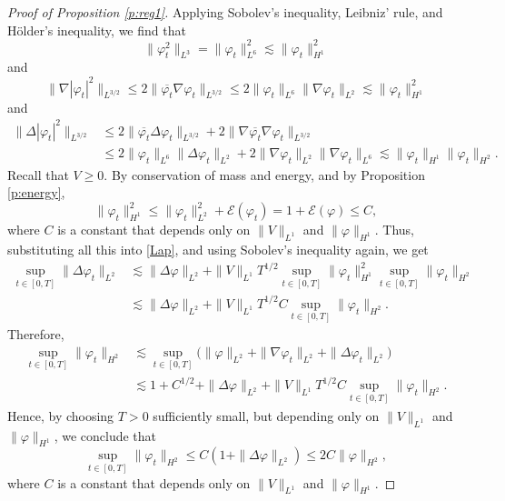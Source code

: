 \documentclass[11pt,a4paper]{scrartcl}
\begin{document}
\begin{proof}[Proof of Proposition \ref{p:reg1}]
  
  Applying Sobolev's inequality, Leibniz' rule, and H\"older's inequality,
  we find that
  \begin{displaymath}
    \| \varphi_t^2 \|_{L^3} = \| \varphi_t \|_{L^6}^2 \apprle \| \varphi_t
    \|_{H^1}^2
  \end{displaymath}
  and
  \begin{displaymath}
    \| \nabla |\varphi_t|^2 \|_{L^{3/2}} \le 2 \| \overline{\varphi_t} \nabla
    \varphi_t \|_{L^{3/2}} \le 2 \| \varphi_t \|_{L^6} \| \nabla \varphi_t
    \|_{L^2} \apprle \| \varphi_t \|_{H^1}^2
  \end{displaymath}
  and
  \begin{align*}
    \| \Delta |\varphi_t|^2 \|_{L^{3/2}} & \le 2 \| \overline{\varphi_t}
    \Delta \varphi_t \|_{L^{3/2}} + 2 \| \nabla \overline{\varphi_t} \nabla
    \varphi_t \|_{L^{3/2}} \\
    & \le 2 \| \varphi_t \|_{L^6} \| \Delta \varphi_t \|_{L^2} + 2\| \nabla
    \varphi_t \|_{L^2} \| \nabla \varphi_t \|_{L^6} \apprle \| \varphi_t
    \|_{H^1} \| \varphi_t \|_{H^2}.
  \end{align*}
  Recall that $V \ge 0$. By conservation of mass and energy, and by
  Proposition \ref{p:energy},
  \begin{displaymath}
    \| \varphi_t \|_{H^1}^2 \le \| \varphi_t \|_{L^2}^2 +
    \mathcal{E}(\varphi_t) = 1 + \mathcal{E}(\varphi) \le C,
  \end{displaymath}
  where $C$ is a constant that depends only on $\| V \|_{L^1}$ and $\| \varphi
  \|_{H^1}$. Thus, substituting all this into \eqref{Lap}, and using Sobolev's
  inequality again, we get
  \begin{align*}
    \sup_{t \in [0,T]} \| \Delta \varphi_t \|_{L^2} & \apprle \| \Delta
    \varphi \|_{L^2} + \| V \|_{L^1} T^{1/2} \sup_{t \in [0,T]} \| \varphi_t
    \|_{H^1}^2 \sup_{t \in [0,T]} \| \varphi_t \|_{H^2} \\ & \apprle \|
    \Delta \varphi \|_{L^2} + \| V \|_{L^1} T^{1/2} C \sup_{t \in [0,T]} \|
    \varphi_t \|_{H^2}.
  \end{align*}
  Therefore,
  \begin{align*}
    \sup_{t \in [0,T]} \| \varphi_t \|_{H^2} & \apprle \sup_{t \in [0,T]}
    \big( \| \varphi \|_{L^2} + \| \nabla \varphi_t \|_{L^2} + \| \Delta
    \varphi_t \|_{L^2} \big) \\
    & \apprle 1 + C^{1/2} + \| \Delta \varphi \|_{L^2} + \| V \|_{L^1} T^{1/2}
    C \sup_{t \in [0,T]} \| \varphi_t \|_{H^2}.
  \end{align*}
  Hence, by choosing $T > 0$ sufficiently small, but depending only on $\| V
  \|_{L^1}$ and $\| \varphi \|_{H^1}$, we conclude that
  \begin{displaymath}
    \sup_{t \in [0,T]} \| \varphi_t \|_{H^2} \le C (1 + \| \Delta \varphi
    \|_{L^2}) \le 2C \| \varphi \|_{H^2},
  \end{displaymath}
  where $C$ is a constant that depends only on $\| V \|_{L^1}$ and $\| \varphi
  \|_{H^1}$.
\end{proof}
\end{document}
